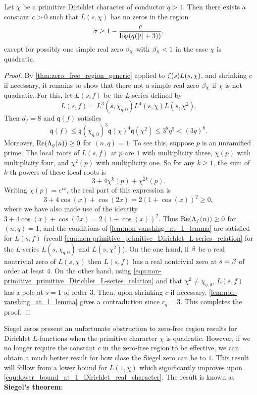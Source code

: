    \begin{theorem}\label{thm:improved_zero-free_region_Dirichlet}
      Let $\chi$ be a primitive Dirichlet character of conductor $q > 1$. Then there exists a constant $c > 0$ such that $L(s,\chi)$ has no zeros in the region
      \[
        \sigma \ge 1-\frac{c}{\log(q(|t|+3))},
      \]
      except for possibly one simple real zero $\beta_{\chi}$ with $\beta_{\chi} < 1$ in the case $\chi$ is quadratic.
    \end{theorem}
    \begin{proof}
      By \cref{thm:zero_free_region_generic} applied to $\zeta(s)L(s,\chi)$, and shrinking $c$ if necessary, it remains to show that there not a simple real zero $\beta_{\chi}$ if $\chi$ is not quadratic. For this, let $L(s,f)$ be the $L$-series defined by
      \[
        L(s,f) = L^{3}(s,\chi_{q,0})L^{4}(s,\chi)L(s,\chi^{2}).
      \]
      Then $d_{f} = 8$ and $\mathfrak{q}(f)$ satisfies
      \[
        \mathfrak{q}(f) \le \mathfrak{q}(\chi_{q,0})^{3}\mathfrak{q}(\chi)^{4}\mathfrak{q}(\chi^{2}) \le 3^{8}q^{5} < (3q)^{8}.
      \]
      Moreover, $\mathrm{Re}(\Lambda_{g}(n)) \ge 0$ for $(n,q) = 1$. To see this, suppose $p$ is an unramified prime. The local roots of $L(s,f)$ at $p$ are $1$ with multiplicity three, $\chi(p)$ with multiplicity four, and $\chi^{2}(p)$ with multiplicity one. So for any $k \ge 1$, the sum of $k$-th powers of these local roots is
      \[
        3+4\chi^{k}(p)+\chi^{2k}(p).
      \]
      Writing $\chi(p) = e^{ix}$, the real part of this expression is
      \[
        3+4\cos(x)+\cos(2x) = 2(1+\cos(x))^{2} \ge 0,
      \]
      where we have also made use of the identity $3+4\cos(x)+\cos(2x) = 2(1+\cos(x))^{2}$. Thus $\mathrm{Re}(\Lambda_{f}(n)) \ge 0$ for $(n,q) = 1$, and the conditions of \cref{lem:non-vanshing_at_1_lemma} are satisfied for $L(s,f)$ (recall \cref{equ:non-primitive_primitive_Dirichlet_L-series_relation} for the $L$-series $L(s,\chi_{q,0})$ and $L(s,\chi^{2})$). On the one hand, if $\beta$ be a real nontrivial zero of $L(s,\chi)$ then $L(s,f)$ has a real nontrivial zero at $s = \beta$ of order at least $4$. On the other hand, using \cref{equ:non-primitive_primitive_Dirichlet_L-series_relation} and that $\chi^{2} \neq \chi_{q,0}$, $L(s,f)$ has a pole at $s = 1$ of order $3$. Then, upon shrinking $c$ if necessary, \cref{lem:non-vanshing_at_1_lemma} gives a contradiction since $r_{g} = 3$. This completes the proof.
    \end{proof}

    Siegel zeros present an unfortunate obstruction to zero-free region results for Dirichlet $L$-functions when the primitive character $\chi$ is quadratic. However, if we no longer require the constant $c$ in the zero-free region to be effective, we can obtain a much better result for how close the Siegel zero can be to $1$. This result will follow from a lower bound for $L(1,\chi)$ which significantly improves upon \cref{equ:lower_bound_at_1_Dirichlet_real_character}. The result is known as \textbf{Siegel's theorem}:

